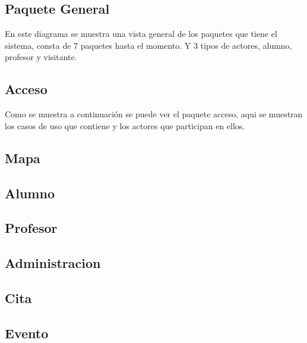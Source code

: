 \pagebreak
\subsection{Paquete General}
 En este diagrama se muestra una vista general de los paquetes que tiene el sistema, consta de 7 paquetes hasta el momento. Y 3 tipos de actores, alumno, profesor y visitante.

\pagebreak	

\subsection{ Acceso}
Como se muestra a continuación se puede ver el paquete acceso, aqui se muestran los casos de uso que contiene y los actores que participan en ellos.

\pagebreak

\subsection{ Mapa}



\pagebreak
\subsection{ Alumno}



\subsection{ Profesor}



\pagebreak
\subsection{ Administracion}

\pagebreak
\subsection{ Cita}


\pagebreak
\subsection{ Evento}



